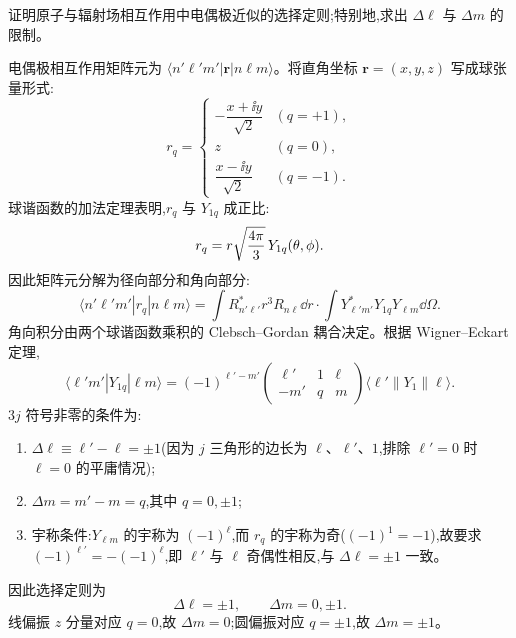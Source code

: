 \begin{question}
证明原子与辐射场相互作用中电偶极近似的选择定则;特别地,求出 $\Delta \ell$ 与 $\Delta m$ 的限制。
\begin{solution}
电偶极相互作用矩阵元为 $\langle n'\ell' m'|\mathbf r|n\ell m\rangle$。将直角坐标 $\mathbf r=(x,y,z)$ 写成球张量形式:
\[
r_q = \begin{cases}
-\dfrac{x+\ii y}{\sqrt2} & (q=+1),\\[4pt]
z & (q=0),\\[4pt]
\dfrac{x-\ii y}{\sqrt2} & (q=-1).
\end{cases}
\]
球谐函数的加法定理表明,$r_q$ 与 $Y_{1q}$ 成正比:
\[
r_q = r\sqrt{4\pi\over3}\,Y_{1q}(\theta,\phi).
\]
因此矩阵元分解为径向部分和角向部分:
\[
\langle n'\ell' m'|r_q|n\ell m\rangle
=\int R_{n'\ell'}^* r^3 R_{n\ell}\dd r
\cdot\int Y_{\ell'm'}^* Y_{1q}Y_{\ell m}\dd\Omega.
\]
角向积分由两个球谐函数乘积的 Clebsch--Gordan 耦合决定。根据 Wigner--Eckart 定理,
\[
\langle \ell' m'|Y_{1q}|\ell m\rangle
=(-1)^{\ell'-m'}\begin{pmatrix}\ell'&1&\ell\\ -m'&q&m\end{pmatrix}
\langle\ell'\|Y_1\|\ell\rangle.
\]
$3j$ 符号非零的条件为:
\begin{enumerate}
\item $\Delta\ell\equiv\ell'-\ell=\pm1$(因为 $j$ 三角形的边长为 $\ell$、$\ell'$、$1$,排除 $\ell'=0$ 时 $\ell=0$ 的平庸情况);
\item $\Delta m=m'-m=q$,其中 $q=0,\pm1$;
\item 宇称条件:$Y_{\ell m}$ 的宇称为 $(-1)^\ell$,而 $r_q$ 的宇称为奇($(-1)^1=-1$),故要求 $(-1)^{\ell'}=-(-1)^\ell$,即 $\ell'$ 与 $\ell$ 奇偶性相反,与 $\Delta\ell=\pm1$ 一致。
\end{enumerate}
因此选择定则为
\[
\boxed{\Delta\ell=\pm1,\qquad\Delta m=0,\pm1.}
\]
线偏振 $z$ 分量对应 $q=0$,故 $\Delta m=0$;圆偏振对应 $q=\pm1$,故 $\Delta m=\pm1$。
\end{solution}
\end{question}

